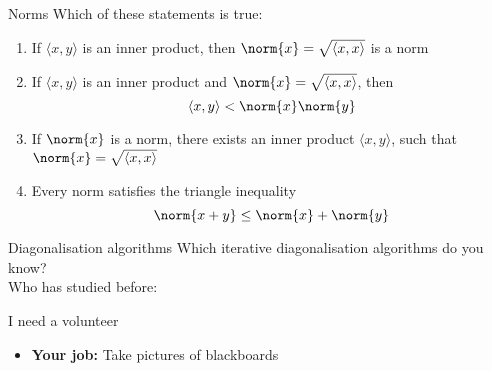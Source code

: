 \begin{frame}{Norms}
    \noindent
    Which of these statements is true:
    \vspace{1em}
    \begin{enumerate}
        \item If $\langle x, y\rangle$ is an inner product,
            then $\norm{x} = \sqrt{\langle x, x \rangle}$ is a norm
        \item If $\langle x, y\rangle$ is an inner product
            and $\norm{x} = \sqrt{\langle x, x \rangle}$, then
            \[ \langle x, y \rangle < \norm{x} \norm{y} \]
        \item If $\norm{x}$ is a norm, there exists an inner product
            $\langle x, y\rangle$, such that $\norm{x} = \sqrt{\langle x, x \rangle}$
        \item Every norm satisfies the triangle inequality
            \[ \norm{x + y} \leq \norm{x} + \norm{y} \]
    \end{enumerate}
    \vspace{1em}
\end{frame}

\begin{frame}{Diagonalisation algorithms}
    \noindent Which iterative diagonalisation algorithms do you know?\\
    \vspace{1em}
    \noindent Who has studied before:
    \vspace{1em}
    \begin{itemize}
    \end{itemize}
\end{frame}




\begin{frame}{I need a volunteer}
    \begin{itemize}
        \item \textbf{Your job:} Take pictures of blackboards
    \end{itemize}
\end{frame}
